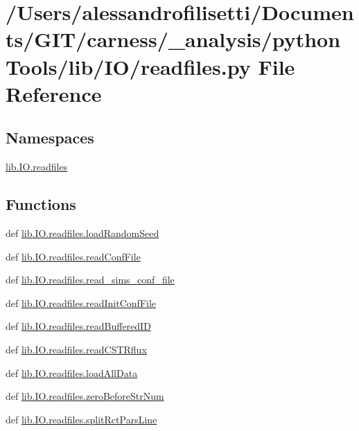 \hypertarget{a00093}{\section{/\+Users/alessandrofilisetti/\+Documents/\+G\+I\+T/carness/\+\_\+analysis/python\+Tools/lib/\+I\+O/readfiles.py File Reference}
\label{a00093}
}
\subsection*{Namespaces}
\begin{DoxyCompactItemize}
\item 
 \hyperlink{a00146}{lib.\+I\+O.\+readfiles}
\end{DoxyCompactItemize}
\subsection*{Functions}
\begin{DoxyCompactItemize}
\item 
def \hyperlink{a00146_a35bd9157c0887704488cc0e2c50bf127}{lib.\+I\+O.\+readfiles.\+load\+Random\+Seed}
\item 
def \hyperlink{a00146_aa0985f97c9159003c7a4bd44d1a989f3}{lib.\+I\+O.\+readfiles.\+read\+Conf\+File}
\item 
def \hyperlink{a00146_a05887f4cca56e48fcb1be55b6b8f5a9b}{lib.\+I\+O.\+readfiles.\+read\+\_\+sims\+\_\+conf\+\_\+file}
\item 
def \hyperlink{a00146_af8a2deca70e9e04a4c4812d81430df19}{lib.\+I\+O.\+readfiles.\+read\+Init\+Conf\+File}
\item 
def \hyperlink{a00146_a4a56e157e25982ad4a7dedd03929dcd6}{lib.\+I\+O.\+readfiles.\+read\+Buffered\+I\+D}
\item 
def \hyperlink{a00146_ab6d9ae4f9d3c52b2aad8b50d9b110dc1}{lib.\+I\+O.\+readfiles.\+read\+C\+S\+T\+Rflux}
\item 
def \hyperlink{a00146_a5ddfb684cfa43cb2aa2d8246078c486c}{lib.\+I\+O.\+readfiles.\+load\+All\+Data}
\item 
def \hyperlink{a00146_a30cdb91109c2d6ea6e0abb808fe88c6f}{lib.\+I\+O.\+readfiles.\+zero\+Before\+Str\+Num}
\item 
def \hyperlink{a00146_a3a9416927822cf24fb30e1d57bf71412}{lib.\+I\+O.\+readfiles.\+split\+Rct\+Pars\+Line}
\end{DoxyCompactItemize}

